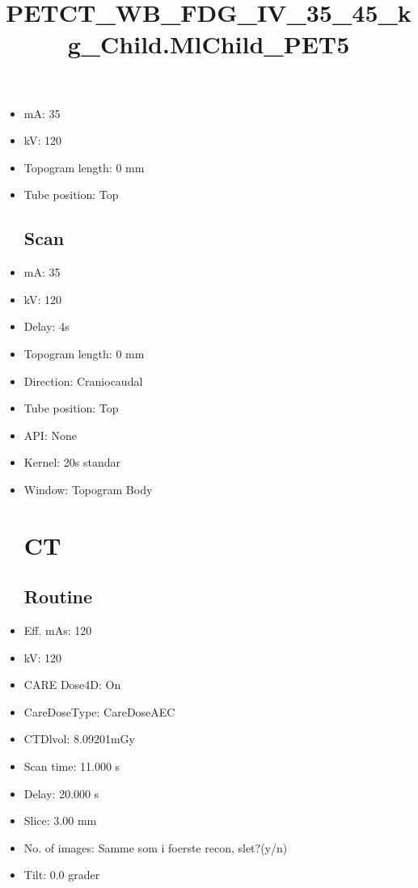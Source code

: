 \documentclass[12pt]{article}
\title{PETCT\_WB\_FDG\_IV\_35\_45\_kg\_Child.MlChild\_PET5}
\begin{document}
\maketitle
\newpage
\tableofcontents
\newpage
{}


\begin{itemize}[noitemsep]\section{Topogram}
\subsection{Routine}
\item mA: 35\item kV: 120\item Topogram length: 0 mm\item Tube position: Top
\subsection{Scan}\item mA: 35\item kV: 120\item Delay: 4s\item Topogram length: 0 mm\item Direction: Craniocaudal\item Tube position: Top\item API: None\item Kernel: 20s standar\item Window: Topogram Body
\section{CT}
\subsection{Routine}
\item Eff. mAs: 120\item kV: 120\item CARE Dose4D: On\item CareDoseType: CareDoseAEC\item CTDlvol: 8.09201mGy\item Scan time: 11.000 s\item Delay: 20.000 s\item Slice: 3.00 mm\item No. of images: Samme som i foerste recon, slet?(y/n)\item Tilt: 0.0 grader

\end{itemize}
\end{document}
